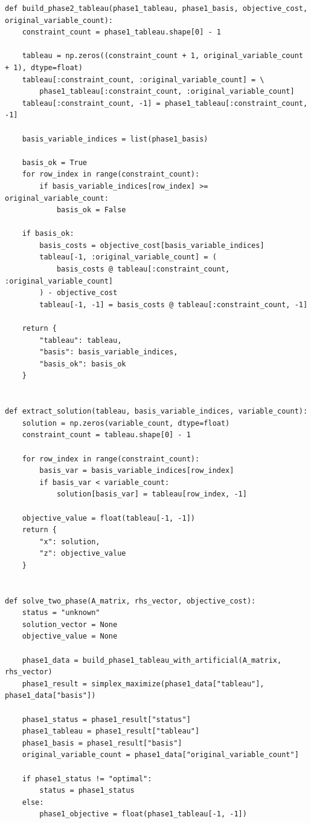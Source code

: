 \documentclass[a4paper,14pt]{extarticle}
\begin{document}
\begin{lstlisting}
def build_phase2_tableau(phase1_tableau, phase1_basis, objective_cost, original_variable_count):
    constraint_count = phase1_tableau.shape[0] - 1

    tableau = np.zeros((constraint_count + 1, original_variable_count + 1), dtype=float)
    tableau[:constraint_count, :original_variable_count] = \
        phase1_tableau[:constraint_count, :original_variable_count]
    tableau[:constraint_count, -1] = phase1_tableau[:constraint_count, -1]

    basis_variable_indices = list(phase1_basis)

    basis_ok = True
    for row_index in range(constraint_count):
        if basis_variable_indices[row_index] >= original_variable_count:
            basis_ok = False

    if basis_ok:
        basis_costs = objective_cost[basis_variable_indices]
        tableau[-1, :original_variable_count] = (
            basis_costs @ tableau[:constraint_count, :original_variable_count]
        ) - objective_cost
        tableau[-1, -1] = basis_costs @ tableau[:constraint_count, -1]

    return {
        "tableau": tableau,
        "basis": basis_variable_indices,
        "basis_ok": basis_ok
    }


def extract_solution(tableau, basis_variable_indices, variable_count):
    solution = np.zeros(variable_count, dtype=float)
    constraint_count = tableau.shape[0] - 1

    for row_index in range(constraint_count):
        basis_var = basis_variable_indices[row_index]
        if basis_var < variable_count:
            solution[basis_var] = tableau[row_index, -1]

    objective_value = float(tableau[-1, -1])
    return {
        "x": solution,
        "z": objective_value
    }


def solve_two_phase(A_matrix, rhs_vector, objective_cost):
    status = "unknown"
    solution_vector = None
    objective_value = None

    phase1_data = build_phase1_tableau_with_artificial(A_matrix, rhs_vector)
    phase1_result = simplex_maximize(phase1_data["tableau"], phase1_data["basis"])

    phase1_status = phase1_result["status"]
    phase1_tableau = phase1_result["tableau"]
    phase1_basis = phase1_result["basis"]
    original_variable_count = phase1_data["original_variable_count"]

    if phase1_status != "optimal":
        status = phase1_status
    else:
        phase1_objective = float(phase1_tableau[-1, -1])


\end{lstlisting}
\end{document}
